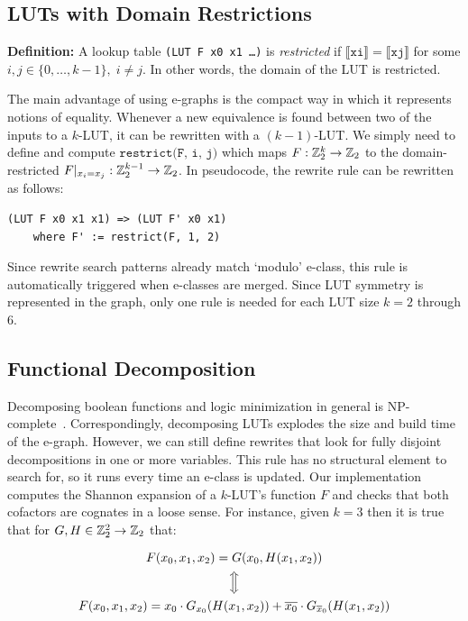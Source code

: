 \subsection{LUTs with Domain Restrictions}\label{sec:rewrites:restrict}

\textbf{Definition:} A lookup table \texttt{(LUT F x0 x1 \ldots)} is \textit{restricted} if $\llbracket \texttt{xi} \rrbracket = \llbracket \texttt{xj} \rrbracket$ for some $ i, j \in \{0, \ldots, k-1\}, \; i \neq j$.
In other words, the domain of the LUT is restricted.

The main advantage of using e-graphs is the compact way in which it represents
notions of equality. Whenever a new equivalence is found between two of the
inputs to a $k$-LUT, it can be rewritten with a $(k-1)$-LUT. We simply need to
define and compute $\texttt{restrict(F, i, j)}$ which maps $F : \mathbb{Z}_{2}^{k}
    \rightarrow \mathbb{Z}_{2}$ to the domain-restricted $F \vert_{x_i = x_j} : \mathbb{Z}_{2}^{k-1}
    \rightarrow \mathbb{Z}_{2}$. In pseudocode, the rewrite rule can be rewritten as follows:

\begin{lstlisting}
(LUT F x0 x1 x1) => (LUT F' x0 x1)
    where F' := restrict(F, 1, 2)
\end{lstlisting}

Since rewrite search patterns already match `modulo' e-class, this rule is
automatically triggered when e-classes are merged. Since LUT symmetry is
represented in the graph, only one rule is needed for each LUT size $k=2$
through 6.

\subsection{Functional Decomposition}\label{sec:rewrites:decomp}

Decomposing boolean functions and logic minimization in general is
NP-complete~\cite{logicmin}. Correspondingly, decomposing LUTs explodes the
size and build time of the e-graph. However, we can still define rewrites that
look for fully disjoint decompositions in one or more variables. This rule has
no structural element to search for, so it runs every time an e-class is
updated. Our implementation computes the Shannon expansion of a $k$-LUT's
function $F$ and checks that both cofactors are cognates in a loose sense. For
instance, given $k=3$ then it is true that for $G, H \in \mathbb{Z}_{2}^2 \rightarrow \mathbb{Z}_{2}$
that:

\begin{gather}
    F(x_0, x_1, x_2) = G(x_0, H(x_1, x_2)) \nonumber \\
    \Big\Updownarrow                       \nonumber \\
    F(x_0, x_1, x_2) = x_0 \cdot G_{x_0} (H(x_1, x_2)) +  \overline{x_0} \cdot G_{\overline{x}_0} (H(x_1, x_2))
\end{gather}

